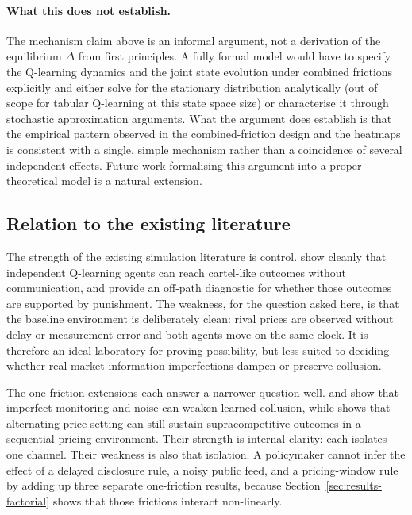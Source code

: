 \paragraph{What this does not establish.} The mechanism claim above is an informal argument, not a derivation of the equilibrium $\Delta$ from first principles. A fully formal model would have to specify the Q-learning dynamics and the joint state evolution under combined frictions explicitly and either solve for the stationary distribution analytically (out of scope for tabular Q-learning at this state space size) or characterise it through stochastic approximation arguments. What the argument does establish is that the empirical pattern observed in the combined-friction design and the heatmaps is consistent with a single, simple mechanism rather than a coincidence of several independent effects. Future work formalising this argument into a proper theoretical model is a natural extension.

\subsection{Relation to the existing literature}

The strength of the existing simulation literature is control. \citet{calvano2020} show cleanly that independent Q-learning agents can reach cartel-like outcomes without communication, and \citet{calvano2023} provide an off-path diagnostic for whether those outcomes are supported by punishment. The weakness, for the question asked here, is that the baseline environment is deliberately clean: rival prices are observed without delay or measurement error and both agents move on the same clock. It is therefore an ideal laboratory for proving possibility, but less suited to deciding whether real-market information imperfections dampen or preserve collusion.

The one-friction extensions each answer a narrower question well. \citet{calvano2021} and \citet{zhang2025} show that imperfect monitoring and noise can weaken learned collusion, while \citet{klein2021} shows that alternating price setting can still sustain supracompetitive outcomes in a sequential-pricing environment. Their strength is internal clarity: each isolates one channel. Their weakness is also that isolation. A policymaker cannot infer the effect of a delayed disclosure rule, a noisy public feed, and a pricing-window rule by adding up three separate one-friction results, because Section~\ref{sec:results-factorial} shows that those frictions interact non-linearly.

